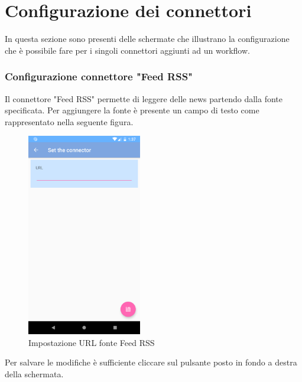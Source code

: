\section{Configurazione dei connettori}
In questa sezione sono presenti delle schermate che illustrano la configurazione che è possibile fare per i singoli connettori aggiunti ad un workflow.
\label{sec:sec_conf_connettori_app}
\subsubsection{Configurazione connettore "Feed RSS"}
Il connettore "Feed RSS" permette di leggere delle news partendo dalla fonte specificata. Per aggiungere la fonte è presente un campo di testo come rappresentato nella seguente figura.
\begin{figure}[H]
	\centering
	\includegraphics[width=5cm]{../includes/pics/configurazione_feed-rss.png}
	\caption{\label{fig:configurazione_feed-rss}Impostazione URL fonte Feed RSS}
\end{figure}
Per salvare le modifiche è sufficiente cliccare sul pulsante posto in fondo a destra della schermata.

